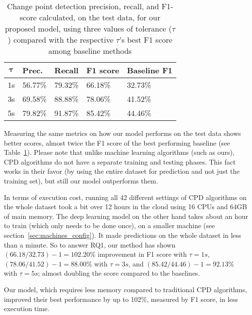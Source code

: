 \begin{table}
\caption{Change point detection precision, recall, and F1-score calculated, on the test data, for our proposed model, using three values of tolerance ($\tau$) compared with the respective $\tau$'s best F1 score among baseline methods}
\label{tab:rq1-2-results}
\begin{tabularx}{\columnwidth}{cXXXX}
\toprule
  $\mathbf{\tau}$ &
  \textbf{Prec.} &
  \textbf{Recall} &
  \textbf{F1 score} & 
  \textbf{Baseline F1}  \\ \midrule
1s & 56.77\% &	79.32\% &	66.18\% & 32.73\% \\
3s & 69.58\% &	88.88\% &	78.06\% & 41.52\% \\
5s & 79.82\% &	91.87\%	&   85.42\% & 44.46\% \\\bottomrule
\end{tabularx}
\end{table}

Measuring the same metrics on how our model performs on the test data shows better scores, almost twice the F1 score of the best performing baseline (see Table~\ref{tab:rq1-2-results}). Please note that unlike machine learning algorithms (such as ours), CPD algorithms do not have a separate training and testing phases. This fact works in their favor (by using the entire dataset for prediction and not just the training set), but still our model outperforms them.

In terms of execution cost, running all 42 different settings of CPD algorithms on the whole dataset took a bit over 12 hours in the cloud using 16 CPUs and 64GB of main memory. The deep learning model on the other hand takes about an hour to train (which only needs to be done once), on a smaller machine (see section~\ref{sec:machines_config}). It made predictions on the whole dataset in less than a minute.
So to answer RQ1, our method has shown $(66.18/32.73)-1=102.20\%$ improvement in F1 score with $\tau=1s$, $(78.06/41.52)-1=88.00\%$ with $\tau=3s$, and $(85.42/44.46)-1=92.13\%$ with $\tau=5s$; almost doubling the score compared to the baselines. 

\begin{rqanswer}
Our model, which requires less memory compared to traditional CPD algorithms, improved their best performance by up to 102\%, measured by F1 score, in less execution time.
\end{rqanswer}

